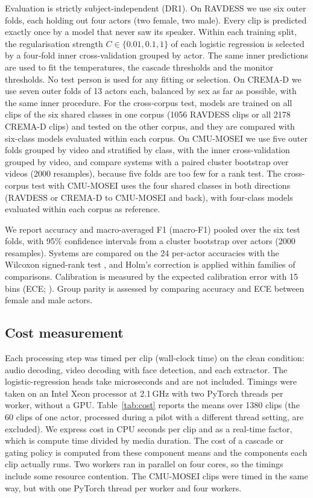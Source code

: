 Evaluation is strictly subject-independent (DR1). On RAVDESS we use six outer folds, each holding out four actors (two female, two male). Every clip is predicted exactly once by a model that never saw its speaker. Within each training split, the regularisation strength $C\in\{0.01,0.1,1\}$ of each logistic regression \citep{pedregosa2011} is selected by a four-fold inner cross-validation grouped by actor. The same inner predictions are used to fit the temperatures, the cascade thresholds and the monitor thresholds. No test person is used for any fitting or selection. On CREMA-D we use seven outer folds of 13 actors each, balanced by sex as far as possible, with the same inner procedure. For the cross-corpus test, models are trained on all clips of the six shared classes in one corpus (1056 RAVDESS clips or all 2178 CREMA-D clips) and tested on the other corpus, and they are compared with six-class models evaluated within each corpus. On CMU-MOSEI we use five outer folds grouped by video and stratified by class, with the inner cross-validation grouped by video, and compare systems with a paired cluster bootstrap over videos (2000 resamples), because five folds are too few for a rank test. The cross-corpus test with CMU-MOSEI uses the four shared classes in both directions (RAVDESS or CREMA-D to CMU-MOSEI and back), with four-class models evaluated within each corpus as reference.

We report accuracy and macro-averaged F1 (macro-F1) pooled over the six test folds, with 95\% confidence intervals from a cluster bootstrap over actors (2000 resamples). Systems are compared on the 24 per-actor accuracies with the Wilcoxon signed-rank test \citep{wilcoxon1945,demsar2006}, and Holm's correction is applied within families of comparisons. Calibration is measured by the expected calibration error with 15 bins (ECE; \citealp{naeini2015}). Group parity is assessed by comparing accuracy and ECE between female and male actors.

\subsection{Cost measurement}

Each processing step was timed per clip (wall-clock time) on the clean condition: audio decoding, video decoding with face detection, and each extractor. The logistic-regression heads take microseconds and are not included. Timings were taken on an Intel Xeon processor at 2.1\,GHz with two PyTorch threads per worker, without a GPU. Table~\ref{tab:cost} reports the means over 1380 clips (the 60 clips of one actor, processed during a pilot with a different thread setting, are excluded). We express cost in CPU seconds per clip and as a real-time factor, which is compute time divided by media duration. The cost of a cascade or gating policy is computed from these component means and the components each clip actually runs. Two workers ran in parallel on four cores, so the timings include some resource contention. The CMU-MOSEI clips were timed in the same way, but with one PyTorch thread per worker and four workers.


